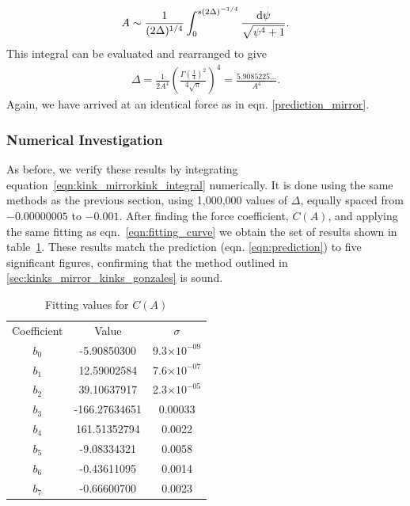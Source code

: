 \documentclass[11pt, oneside]{article}  	%
\numberwithin{equation}{section}
\newcommand{\drv}{\ensuremath{\textup{d}}}
\begin{document}
\begin{align}
    A \sim \frac{1}{(2\Delta)^{1/4}} \int_{0}^{s(2\Delta)^{-1/4}} \frac{\drv \psi}{ \sqrt{\psi^4 + 1} } .
\end{align}
This integral can be evaluated and rearranged to give
\begin{align}\label{eqn:prediction}
    \Delta = \frac{1}{2 A^4} \left ( \frac{\Gamma\left ( \frac{1}{4}\right )  ^2}{4\sqrt{\pi}}\right )^4 = \frac{5.9085225...}{A^4}.
\end{align}
Again, we have arrived at an identical force as in eqn. \ref{prediction_mirror}.

\subsubsection{Numerical Investigation}
As before, we verify these results by integrating equation~\ref{eqn:kink_mirrorkink_integral} numerically. It is done using the same methods as the previous section, using 1,000,000 values of $\Delta$, equally spaced from $-0.00000005$ to $-0.001$. After finding the force coefficient, $C(A)$, and applying the same fitting as eqn.~\ref{eqn:fitting_curve} we obtain the set of results shown in table~\ref{table:gonzales_mirrorkink}. These results match the prediction (eqn. \ref{eqn:prediction}) to five significant figures, confirming that the method outlined in \textsection\ref{sec:kinks_mirror_kinks_gonzales} is sound.
\begin{table}[ht]
    \caption{Fitting values for $C(A)$}
    \begin{center}\label{table:gonzales_mirrorkink}
    \begin{tabular}{|c|c|c|}
        Coefficient & Value & $\sigma$\\
        $b_ 0 $ &  -5.90850300  &  9.3$\times10^{-09}$\\
        $b_ 1 $ &  12.59002584  &  7.6$\times10^{-07}$\\
        $b_ 2 $ &  39.10637917  &  2.3$\times10^{-05}$\\
        $b_ 3 $ &  -166.27634651  &  0.00033\\
        $b_ 4 $ &  161.51352794  &  0.0022\\
        $b_ 5 $ &  -9.08334321  &  0.0058\\
        $b_ 6 $ &  -0.43611095  &  0.0014\\
        $b_ 7 $ &  -0.66600700  &  0.0023\\
    \end{tabular}
    \end{center}
\end{table}
\end{document}
